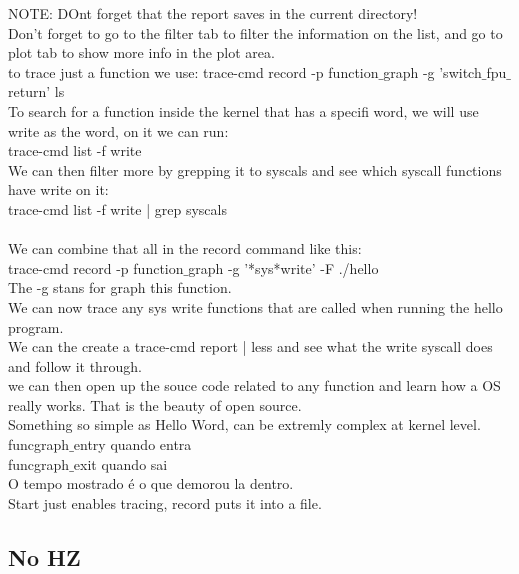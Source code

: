 \documentclass[11pt, a4paper, oneside]{article}
\theoremstyle{definition}
\begin{document}
NOTE: DOnt forget that the report saves in the current directory!\\

Don't forget to go to the filter tab to filter the information on the list, and go to plot tab to show more info in the plot area.\\

to trace just a function we use:
trace-cmd record -p function$\_$graph -g 'switch$\_$fpu$\_$return' ls\\

To search for a function inside the kernel that has a specifi word, we will use write as the word, on it we can run:\\
trace-cmd list -f write\\
We can then filter more by grepping it to syscals and see which syscall functions have write on it:\\
trace-cmd list -f write | grep syscals\\
\\
We can combine that all in the record command like this:\\
trace-cmd record -p function$\_$graph -g '*sys*write' -F ./hello\\
The -g stans for graph this function.\\ 
We can now trace any sys write functions that are called when running the hello program.\\
We can the create a trace-cmd report | less and see what the write syscall does and follow it through.\\
we can then open up the souce code related to any function and learn how a OS really works. That is the beauty of open source.\\

Something so simple as Hello Word, can be extremly complex at kernel level.\\

funcgraph$\_$entry quando entra\\
funcgraph$\_$exit quando sai\\
O tempo mostrado é o que demorou la dentro.\\

Start just enables tracing, record puts it into a file.


\subsection{No HZ}
\end{document}
